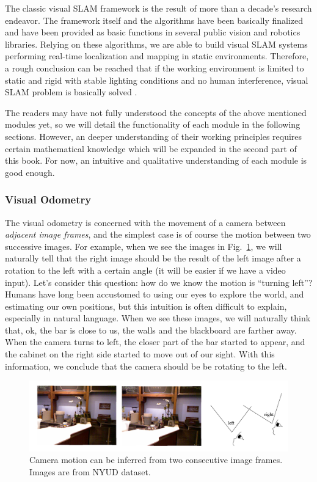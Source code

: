 The classic visual SLAM framework is the result of more than a decade's research endeavor. The framework itself and the algorithms have been basically finalized and have been provided as basic functions in several public vision and robotics libraries. Relying on these algorithms, we are able to build visual SLAM systems performing real-time localization and mapping in static environments. Therefore, a rough conclusion can be reached that if the working environment is limited to static and rigid with stable lighting conditions and no human interference, visual SLAM problem is basically solved \cite{Cadena2016}.

The readers may have not fully understood the concepts of the above mentioned modules yet, so we will detail the functionality of each module in the following sections. However, an deeper understanding of their working principles requires certain mathematical knowledge which will be expanded in the second part of this book. For now, an intuitive and qualitative understanding of each module is good enough.

\subsubsection{Visual Odometry}

The visual odometry is concerned with the movement of a camera between \emph{adjacent image frames}, and the simplest case is of course the motion between two successive images. For example, when we see the images in Fig.~\ref{fig:cameramotion}, we will naturally tell  that the right image should be the result of the left image after a rotation to the left with a certain angle (it will be easier if we have a video input). Let's consider this question: how do we know the motion is ``turning left''? Humans have long been accustomed to using our eyes to explore the world, and estimating our own positions, but this intuition is often difficult to explain, especially in natural language. When we see these images, we will naturally think that, ok, the bar is close to us, the walls and the blackboard are farther away. When the camera turns to left, the closer part of the bar started to appear, and the cabinet on the right side started to move out of our sight. With this information, we conclude that the camera should be be rotating to the left.

\begin{figure}
    \centering
    \includegraphics[width=1.0\textwidth]{./resources/whatIsSLAM/cameramotion.pdf}
    \caption{Camera motion can be inferred from two consecutive image frames. Images are from NYUD dataset.}
    \label{fig:cameramotion}
\end{figure}


